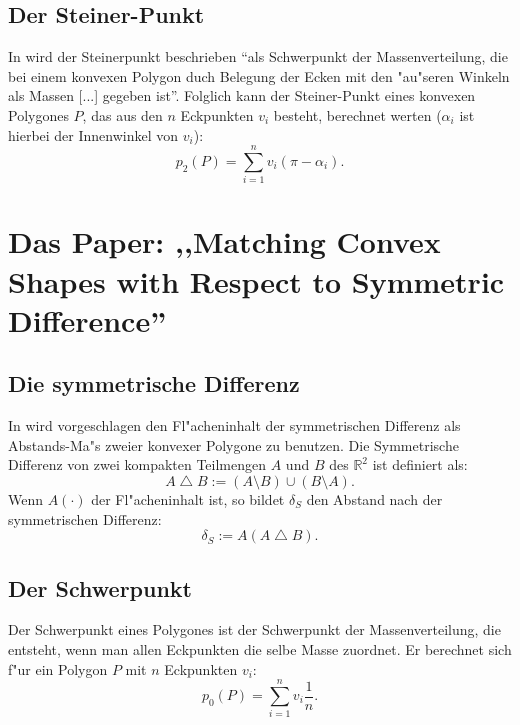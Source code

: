 \subsection{Der Steiner-Punkt}

In \cite{Sch} wird der Steinerpunkt beschrieben "`als Schwerpunkt der Massenverteilung, die bei einem konvexen Polygon duch Belegung der Ecken mit den "au"seren Winkeln als Massen [...] gegeben ist"'. Folglich kann der Steiner-Punkt eines konvexen Polygones $P$, das aus den $n$ Eckpunkten $v_i$ besteht, berechnet werten ($\alpha_i$ ist hierbei der Innenwinkel von $v_i$):
\[p_2(P)=\sum^n_{i=1}v_i (\pi-\alpha_i).\]

\section{Das Paper: ,,Matching Convex Shapes with Respect to Symmetric Difference'' }

\subsection{Die symmetrische Differenz}

In \cite{AFRW} wird vorgeschlagen den Fl"acheninhalt der symmetrischen Differenz als Abstands-Ma"s zweier konvexer Polygone zu benutzen. Die Symmetrische Differenz von zwei kompakten Teilmengen $A$ und $B$ des $\mathbb{R}^2 $ ist definiert als:
\[A\bigtriangleup B:=(A\setminus B)\cup(B\setminus A).\]
Wenn $A(\cdot)$ der Fl"acheninhalt ist, so bildet $\delta_S$ den Abstand nach der symmetrischen Differenz:
\[\delta_S:=A(A \bigtriangleup B).\]

\subsection{Der Schwerpunkt}

Der Schwerpunkt eines Polygones ist der Schwerpunkt der Massenverteilung, die entsteht, wenn man allen Eckpunkten die selbe Masse zuordnet. Er berechnet sich f"ur ein Polygon $P$ mit $n$ Eckpunkten $v_i$:
\[p_0(P)=\sum^n_{i=1}v_i \frac{1}{n}.\]


